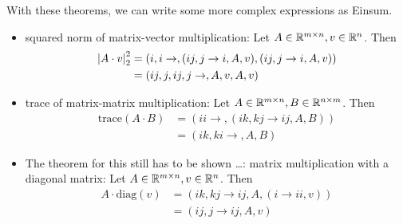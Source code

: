 

With these theorems, we can write some more complex expressions as Einsum.
\begin{itemize}
    \item squared norm of matrix-vector multiplication: Let $A \in \mathbb{R}^{m \times n}, v \in \mathbb{R}^{n}$. Then
          \begin{align*}
              \left| A \cdot v \right|_2^2 & = (i,i\rightarrow,(ij, j \rightarrow i, A, v),(ij, j \rightarrow i, A, v)) \\
                                  & = (ij,j,ij,j\rightarrow,A,v,A,v)
          \end{align*}
    \item trace of matrix-matrix multiplication: Let $A \in \mathbb{R}^{m \times n}, B \in \mathbb{R}^{n \times m}$. Then
          \begin{align*}
              \text{trace}(A \cdot B) & = (ii \rightarrow, (ik, kj \rightarrow ij, A, B)) \\
                                      & = (ik, ki \rightarrow, A, B)
          \end{align*}
    \item The theorem for this still has to be shown \dots:
          matrix multiplication with a diagonal matrix: Let $A \in \mathbb{R}^{m \times n}, v \in \mathbb{R}^{n}$. Then
          \begin{align*}
              A \cdot \text{diag}(v) & = (ik, kj \rightarrow ij, A, (i \rightarrow ii, v)) \\
                                     & = (ij, j \rightarrow ij, A, v)                      \\
          \end{align*}
\end{itemize}


